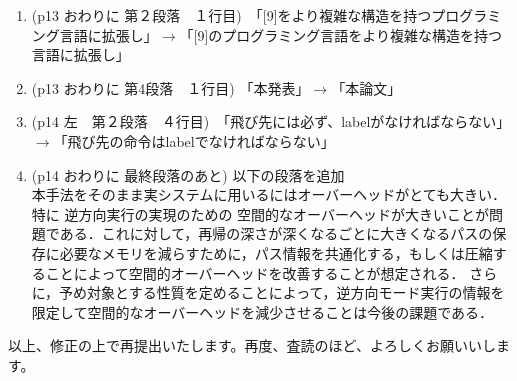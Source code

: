 \documentclass[a4j]{jarticle}
\begin{document}
\begin{enumerate}
\item (p13 おわりに 第２段落　１行目)　「[9]をより複雑な構造を持つプログラミング言語に拡張し」$\rightarrow$「[9]のプログラミング言語をより複雑な構造を持つ言語に拡張し」
\item (p13 おわりに 第4段落　１行目) 「本発表」$\rightarrow$「本論文」
\item (p14 左　第２段落　４行目)　「飛び先には必ず、labelがなければならない」$\rightarrow$「飛び先の命令はlabelでなければならない」
\item (p14 おわりに 最終段落のあと) 以下の段落を追加\\

本手法をそのまま実システムに用いるにはオーバーヘッドがとても大きい．
特に%
逆方向実行の実現のための%
空間的なオーバーヘッドが大きいことが問題である．これに対して，再帰の深さが深くなるごとに大きくなるパスの保存に必要なメモリを減らすために，パス情報を共通化する，もしくは圧縮することによって空間的オーバーヘッドを改善することが想定される．
さらに，予め対象とする性質を定めることによって，逆方向モード実行の情報を
限定して空間的なオーバーヘッドを減少させることは今後の課題である．

\end{enumerate}

以上、修正の上で再提出いたします。再度、査読のほど、よろしくお願いいします。
\end{document}
